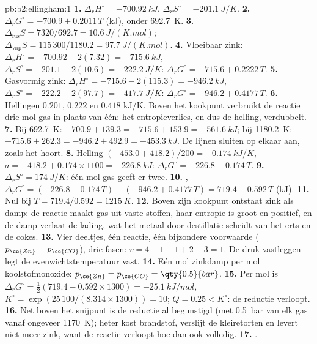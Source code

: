 \begin{solution}{pb:b2:ellingham:1}
\textbf{1.} $\Delta_r H^\circ = \qty{-700.92}{kJ}$, $\Delta_r S^\circ =
\qty{-201.1}{J/K}$.
\textbf{2.} $\Delta_r G^\circ = -700.9 + 0.2011\,T$ (\unit{kJ}), onder
\qty{692.7}{K}.
\textbf{3.} $\Delta_{\text{fus}}S = 7320/692.7 = \qty{10.6}{J/(K.mol)}$;
$\Delta_{\text{vap}}S = 115\,300/1180.2 = \qty{97.7}{J/(K.mol)}$.
\textbf{4.} Vloeibaar zink: $\Delta_r H^\circ = -700.92 - 2(7.32) = \qty{-715.6}{kJ}$,
$\Delta_r S^\circ = -201.1 - 2(10.6) = \qty{-222.2}{J/K}$: $\Delta_r G^\circ =
-715.6 + 0.2222\,T$.
\textbf{5.} Gasvormig zink: $\Delta_r H^\circ = -715.6 - 2(115.3) = \qty{-946.2}{kJ}$,
$\Delta_r S^\circ = -222.2 - 2(97.7) = \qty{-417.7}{J/K}$: $\Delta_r G^\circ =
-946.2 + 0.4177\,T$.
\textbf{6.} Hellingen $0.201$, $0.222$ en $0.418$ \unit{kJ/K}. Boven het kookpunt
verbruikt de reactie drie mol gas in plaats van één: het entropieverlies, en dus de helling,
verdubbelt.
\textbf{7.} Bij \qty{692.7}{K}: $-700.9 + 139.3 = -715.6 + 153.9 = \qty{-561.6}{kJ}$;
bij \qty{1180.2}{K}: $-715.6 + 262.3 = -946.2 + 492.9 = \qty{-453.3}{kJ}$. De
lijnen sluiten op elkaar aan, zoals het hoort.
\textbf{8.} Helling $(-453.0 + 418.2)/200 = \qty{-0.174}{kJ/K}$, $a = -418.2 +
0.174 \times 1100 = \qty{-226.8}{kJ}$: $\Delta_r G^\circ = -226.8 - 0.174\,T$.
\textbf{9.} $\Delta_r S^\circ = \qty{+174}{J/K}$: één mol gas geeft er twee.
\textbf{10.} , $\Delta_r G^\circ = (-226.8 - 0.174\,T)
- (-946.2 + 0.4177\,T) = 719.4 - 0.592\,T$ (\unit{kJ}).
\textbf{11.} Nul bij $T = 719.4/0.592 = \qty{1215}{K}$.
\textbf{12.} Boven zijn kookpunt ontstaat zink als damp: de reactie maakt
gas uit vaste stoffen, haar entropie is groot en positief, en de damp verlaat de
lading, wat het metaal door destillatie scheidt van het erts en de cokes.
\textbf{13.} Vier deeltjes, één reactie, één bijzondere voorwaarde ($p_{\ce{Zn}} =
p_{\ce{CO}}$), drie fasen: $v = 4 - 1 - 1 + 2 - 3 = 1$. De druk vastleggen
legt de evenwichtstemperatuur vast.
\textbf{14.} Eén mol zinkdamp per mol koolstofmonoxide:
$p_{\ce{Zn}} = p_{\ce{CO}} = \qty{0.5}{bar}$.
\textbf{15.} Per mol  is $\Delta_r G^\circ = \frac12(719.4 - 0.592 \times
1300) = \qty{-25.1}{kJ/mol}$, $K^\circ = \exp(25\,100/(8.314 \times 1300)) = 10$;
$Q = 0.25 < K^\circ$: de reductie verloopt.
\textbf{16.} Net boven het snijpunt is de reductie al begunstigd (met
\qty{0.5}{bar} van elk gas vanaf ongeveer \qty{1170}{K}); heter kost brandstof,
verslijt de kleiretorten en levert niet meer zink, want de reactie verloopt
hoe dan ook volledig.
\textbf{17.} .

\end{solution}
